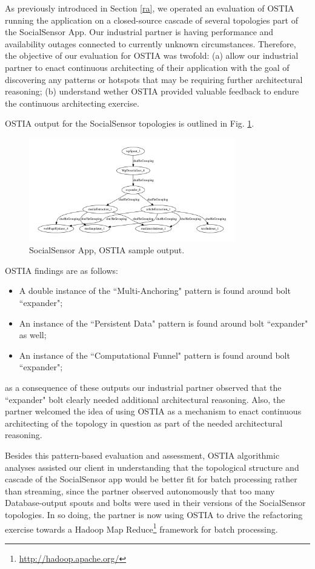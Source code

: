 As previously introduced in Section \ref{ra}, we operated an evaluation of OSTIA running the application on a closed-source cascade of several topologies part of the SocialSensor App. Our industrial partner is having performance and availability outages connected to currently unknown circumstances. Therefore, the objective of our evaluation for OSTIA was twofold: (a) allow our industrial partner to enact continuous architecting of their application with the goal of discovering any patterns or hotspots that may be requiring further architectural reasoning; (b) understand wether OSTIA provided valuable feedback to endure the continuous architecting exercise.

OSTIA output for the SocialSensor topologies is outlined in Fig. \ref{topo1}.

\begin{figure}[H]
		\includegraphics[width=9cm]{images/output/focused_crawler}
		\caption{SocialSensor App, OSTIA sample output.}
		\label{topo1}
\end{figure}

OSTIA findings are as follows:
\begin{itemize}
\item A double instance of the ``Multi-Anchoring" pattern is found around bolt ``expander";
\item An instance of the ``Persistent Data" pattern is found around bolt ``expander" as well;
\item An instance of the ``Computational Funnel" pattern is found around bolt ``expander";
\end{itemize}

as a consequence of these outputs our industrial partner observed that the ``expander" bolt clearly needed additional architectural reasoning. Also, the partner welcomed the idea of using OSTIA as a mechanism to enact continuous architecting of the topology in question as part of the needed architectural reasoning.

Besides this pattern-based evaluation and assessment, OSTIA algorithmic analyses assisted our client in understanding that the topological structure and cascade of the SocialSensor app would be better fit for batch processing rather than streaming, since the partner observed autonomously that too many Database-output spouts and bolts were used in their versions of the SocialSensor topologies. In so doing, the partner is now using OSTIA to drive the refactoring exercise towards a Hadoop Map Reduce\footnote{\url{http://hadoop.apache.org/}} framework for batch processing.

